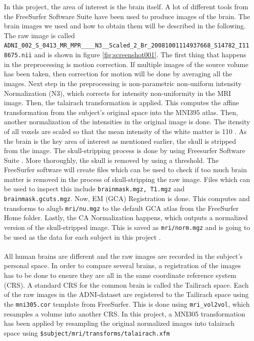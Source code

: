 \documentclass[12pt, fleqn, titlepage]{article}
\newcommand{\1}[1]{\mathds{1}\left[#1\right]}
\begin{document}
In this project, the area of interest is the brain itself. A lot of different tools from the FreeSurfer Software Suite have been used to produce images of the brain. The brain images we used and how to obtain them will be described in the following. The raw image is called \newline \texttt{
ADNI\_002\_S\_0413\_MR\_MPR\_\_\_\_N3\_\_Scaled\_2\_Br\_20081001114937668\_S14782\_I118675.nii} and is shown in figure \ref{fig:screenshot001}. The first thing that happens in the preprocessing is motion correction. If multiple images of the source volume has been taken, then correction for motion will be done by averaging all the images.
Next step in the preprocessing is non-parametric non-uniform intensity Normalization (N3), which corrects for intensity non-uniformity in the MRI image.
Then, the talairach transformation is applied. This computes the affine transformation from the subject's original space into the MNI395 atlas.
Then, another normalization of the intensities in the original image is done. The itensity of all voxels are scaled so that the mean intensity of the white matter is 110 \cite{normalize}. 
As the brain is the key area of interest as mentioned earlier, the skull is stripped from the image. The skull-stripping process is done by using Freesurfer Software Suite \cite{freesurfer}.
More thoroughly, the skull is removed by using a threshold.
The FreeSurfer software will create files which can be used to check if too much brain matter is removed in the process of skull-stripping the raw image.
Files which can be used to inspect this include \texttt{brainmask.mgz, T1.mgz} and \texttt{brainmask.gcuts.mgz}.
Now, EM (GCA) Registration is done. This computes and transforms to alugb %
\texttt{mri/nu.mgz} to the default GCA atlas from the FreeSurfer Home folder. Lastly, the CA Normalization happens, which outputs a normalized version of the skull-stripped image. This is saved as \texttt{mri/norm.mgz} and is going to be used as the data for each subject in this project \cite{reckon}.
\\\\
All human brains are different and the raw images are recorded in the subject's personal space. 
In order to compare several brains, a registration of the images has to be done to ensure they are all in the same coordinate reference system (CRS). 
A standard CRS for the common brain is called the Tailirach space. 
Each of the raw images in the ADNI-dataset are registered to the Tailirach space using the \texttt{mni305.cor} template from FreeSurfer. 
This is done using \texttt{mri\_vol2vol}, which resamples a volume into another CRS. 
In this project, a MNI305 transformation has been applied by resampling the original normalized images into talairach space using \texttt{\$subject/mri/transforms/talairach.xfm} %
\end{document}
